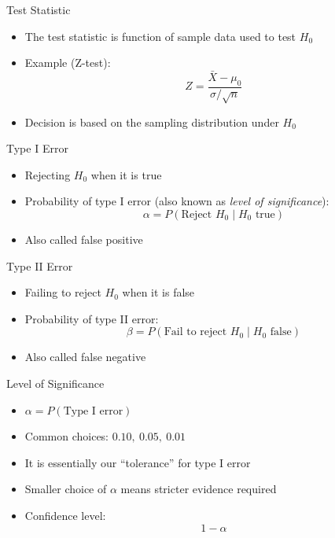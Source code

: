 \documentclass[12pt, aspectratio=169]{beamer}
\begin{document}
    \begin{frame}{Test Statistic}
        \begin{itemize}
            \item The test statistic is function of sample data used to test $H_0$
            \item Example (Z-test):
            \[
            Z = \frac{\bar{X} - \mu_0}{\sigma/\sqrt{n}}
            \]
            \item Decision is based on the sampling distribution under $H_0$
        \end{itemize}
    \end{frame}


    \begin{frame}{Type I Error}
        \begin{itemize}
            \item Rejecting $H_0$ when it is true
            \item Probability of type I error (also known as \emph{level of significance}):
            \[
            \alpha = P(\text{Reject } H_0 \mid H_0 \text{ true})
            \]
            \item Also called false positive
        \end{itemize}
    \end{frame}


    \begin{frame}{Type II Error}
        \begin{itemize}
            \item Failing to reject $H_0$ when it is false
            \item Probability of type II error:
            \[
            \beta = P(\text{Fail to reject } H_0 \mid H_0 \text{ false})
            \]
            \item Also called false negative
        \end{itemize}
    \end{frame}


    \begin{frame}{Level of Significance}
        \begin{itemize}
            \item $\alpha = P(\text{Type I error})$
            \item Common choices: $0.10,\ 0.05,\ 0.01$
            \item It is essentially our ``tolerance'' for type I error
            \item Smaller choice of $\alpha$ means stricter evidence required
            \item Confidence level:
            \[
            1 - \alpha
            \]
        \end{itemize}
    \end{frame}
\end{document}
